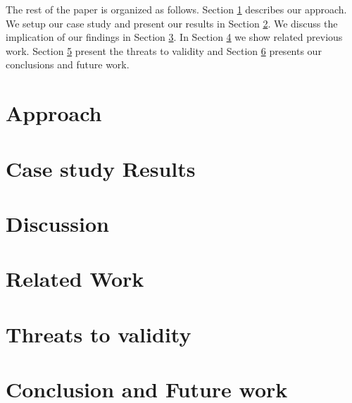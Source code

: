 \documentclass{sig-alternate}
\begin{document}
The rest of the paper is organized as follows. Section \ref{sec:approach} describes our approach. We setup our case study and present our
results in Section \ref{sec:case_study_results}. We discuss the implication of our findings in Section \ref{sec:discussion}. In Section \ref{sec:related_work} we show related previous work. Section \ref{sec:threats_to_validity} present the threats to validity and Section \ref{sec:conclusion} presents our conclusions and future work.  

\section{Approach}
\label{sec:approach}


\section{Case study Results}
\label{sec:case_study_results}


\section{Discussion}
\label{sec:discussion}


\section{Related Work}
\label{sec:related_work}


\section{Threats to validity}
\label{sec:threats_to_validity}


\section{Conclusion and Future work}
\label{sec:conclusion}



  


\end{document}
